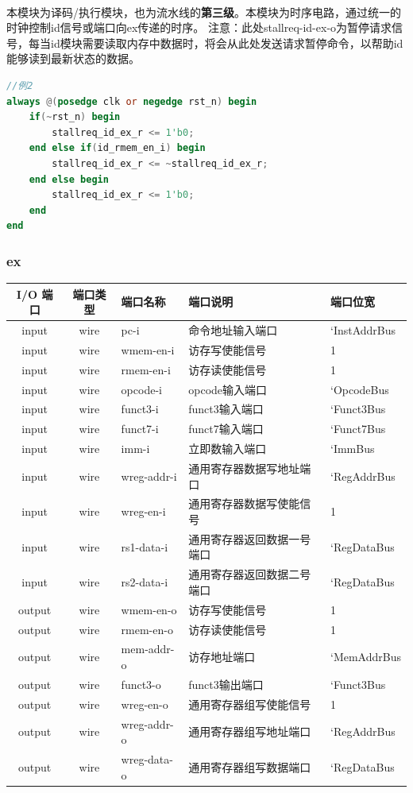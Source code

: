 \documentclass[lang=cn,11pt,a4paper]{elegantpaper}
\begin{document}
\\
	本模块为译码/执行模块，也为流水线的\textbf{第三级}。本模块为时序电路，通过统一的时钟控制id信号或端口向ex传递的时序。
	注意：此处stallreq-id-ex-o为暂停请求信号，每当id模块需要读取内存中数据时，将会从此处发送请求暂停命令，以帮助id能够读到最新状态的数据。
	\begin{lstlisting}[language=verilog]
		//例2
always @(posedge clk or negedge rst_n) begin
	if(~rst_n) begin
		stallreq_id_ex_r <= 1'b0;
	end else if(id_rmem_en_i) begin
		stallreq_id_ex_r <= ~stallreq_id_ex_r;
	end else begin
		stallreq_id_ex_r <= 1'b0;
	end
end
	\end{lstlisting}
	
\subsubsection{ex}
\begin{tabular}{cclll}
	\toprule
	I/O 端口 & 端口类型 &端口名称&端口说明 &端口位宽\\
	\midrule
	input &wire& pc-i & 命令地址输入端口       & `InstAddrBus  \\
	input &wire& wmem-en-i & 访存写使能信号 & 1 \\
	input &wire& rmem-en-i & 访存读使能信号 & 1 \\
	input &wire& opcode-i & opcode输入端口    & `OpcodeBus   \\
	input &wire& funct3-i & funct3输入端口    & `Funct3Bus   \\
	input &wire& funct7-i & funct7输入端口    & `Funct7Bus   \\
	input &wire& imm-i & 立即数输入端口    & `ImmBus   \\
	
	input &wire& wreg-addr-i & 通用寄存器数据写地址端口 & `RegAddrBus \\
	input &wire& wreg-en-i & 通用寄存器数据写使能信号 & 1  \\
	input &wire& rs1-data-i  & 通用寄存器返回数据一号端口 & `RegDataBus  \\
	input &wire& rs2-data-i  & 通用寄存器返回数据二号端口 & `RegDataBus  \\
	
	output &wire& wmem-en-o & 访存写使能信号 & 1 \\
	output &wire& rmem-en-o & 访存读使能信号 & 1 \\
	output &wire& mem-addr-o &  访存地址端口   & `MemAddrBus   \\
	output &wire& funct3-o & funct3输出端口    & `Funct3Bus   \\
	output &wire& wreg-en-o & 通用寄存器组写使能信号    & 1   \\
	output &wire& wreg-addr-o & 通用寄存器组写地址端口    & `RegAddrBus  \\
	output &wire& wreg-data-o & 通用寄存器组写数据端口    & `RegDataBus  \\
	\bottomrule
\end{tabular}\\
\end{document}

